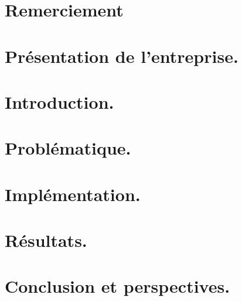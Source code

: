 \documentclass[a4paper, 12pt]{article}
\begin{document}
	\section*{Remerciement}
	\thispagestyle{plain}
	
	\cleardoublepage


	\tableofcontents
	\thispagestyle{empty}
	\cleardoublepage
	\thispagestyle{plain}
	\listoffigures
	\cleardoublepage

	\setcounter{page}{1}
	\pagestyle{fancy}
	\vspace*{1cm}
	\section{Présentation de l'entreprise.}
	
	\newpage

	\section{Introduction.}\label{sec:intro}
	\vspace*{0.5cm}
	
	\newpage
	\section{Problématique.}
	

	\newpage
	\section{Implémentation.}
	

	\newpage
	\section{Résultats.}
	
	\newpage
	\section{Conclusion et perspectives.}
	
	\newpage
	\thispagestyle{plain} 
\end{document}
